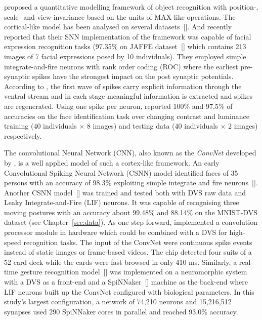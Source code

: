 \cite{riesenhuber1999hierarchical} proposed a quantitative modelling framework of object recognition with position-, scale- and view-invariance based on the units of MAX-like operations.
The cortical-like model has been analysed on several datasets~[\cite{serre2007robust}].
And recently \cite{fu_spiking_2012} reported that their SNN implementation of the framework was capable of facial expression recognition tasks (97.35\% on JAFFE dataset~[\cite{lyons1998coding}] which contains 213 images of 7 facial expressions posed by 10 individuals).
They employed simple integrate-and-fire neurons with rank order coding (ROC) where  the earliest pre-synaptic spikes have the strongest impact on the post synaptic potentials.
According to \cite{vanrullen_surfing_2002}, the first wave of spikes  carry explicit information through the ventral stream and in each stage meaningful information is extracted and spikes are regenerated. 
Using one spike per neuron, \cite{delorme_face_2001} reported 100\% and 97.5\% of accuracies on the face identification task over changing  contrast and luminance training (40 individuals $\times$ 8 images) and testing data (40 individuals $\times$ 2 images) respectively.

The convolutional Neural Network (CNN), also known as the \textit{ConvNet} developed by \cite{lecun1995convolutional}, is a well applied model of such a cortex-like framework.
An early Convolutional Spiking Neural Network (CSNN) model identified faces of 35 persons with an accuracy of 98.3\% exploiting simple integrate and fire neurons~[\cite{matsugu2002convolutional}].
Another CSNN model~[\cite{zhao_feedforward_2014}] was trained and tested both with DVS raw data and Leaky Integrate-and-Fire (LIF) neurons.
It was capable of recognising three moving postures with an accuracy about 99.48\% and 88.14\% on the MNIST-DVS dataset (see Chapter~\ref{sec:data}).
As one step forward, \cite{camunas2012event} implemented a convolution processor module in hardware which could be combined with a DVS for high-speed recognition tasks.
The input of the ConvNet were continuous spike events instead of static images or frame-based videos. 
The chip detected four suits of a 52 card deck while the cards were fast browsed in only 410 ms.
Similarly, a real-time gesture recognition model~[\cite{liu2014real}] was implemented on a neuromorphic system with a DVS as a front-end and a SpiNNaker~[\cite{furber2013overview}] machine as the back-end where LIF neurons built up the ConvNet configured with biological parameters.
In this study's largest configuration, a network of 74,210 neurons and 15,216,512 synapses used 290 SpiNNaker cores in parallel and reached 93.0\% accuracy. 

